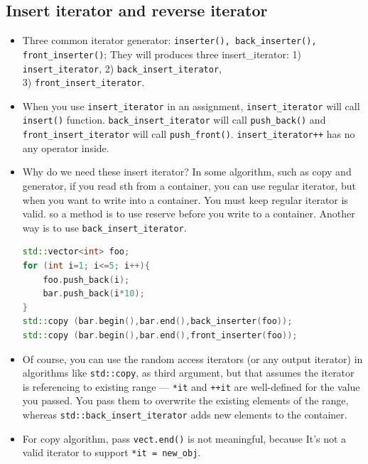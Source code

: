 \documentclass[a4paper,11pt,twoside]{book}
\begin{document}
\subsection{Insert iterator and reverse iterator}
\begin{itemize}
	
	\item Three common iterator generator: \texttt{inserter(), back\_inserter(), front\_inserter()};  They will produces three insert\_iterator: 1) \texttt{insert\_iterator}, 2) \texttt{back\_insert\_iterator}, \\ 
	3) \texttt{front\_insert\_iterator}.

	\item When you use \texttt{insert\_iterator} in an assignment, \texttt{insert\_iterator} will call \texttt{insert()} function.  \newline 
\texttt{back\_insert\_iterator} will call \texttt{push\_back()} and \texttt{front\_insert\_iterator} will call \texttt{push\_front()}. \texttt{insert\_iterator++} has no any operator inside.


	\item Why do we need these insert iterator? In some algorithm, such as copy and generator, if you read sth from a container, you can use regular iterator, but when you want to write into a container.  You must keep regular iterator is valid. so a method is to use reserve before you write to a container. Another way is to use \texttt{back\_insert\_iterator}.
\begin{lstlisting}[frame=single, language=c++]
std::vector<int> foo;
for (int i=1; i<=5; i++){ 
	foo.push_back(i); 
	bar.push_back(i*10); 
}
std::copy (bar.begin(),bar.end(),back_inserter(foo));
std::copy (bar.begin(),bar.end(),front_inserter(foo));
\end{lstlisting}

	\item Of course, you can use the random access iterators (or any output iterator) in algorithms like \texttt{std::copy}, as third argument, but that assumes the iterator is referencing to existing range — \texttt{*it} and \texttt{++it} are well-defined for the value you passed. You pass them to overwrite the existing elements of the range, whereas \texttt{std::back\_insert\_iterator} adds new elements to the container.

	\item For copy algorithm, pass \texttt{vect.end()} is not meaningful, because It's not a valid iterator to support \texttt{*it = new\_obj}.


\end{itemize}
\end{document}
